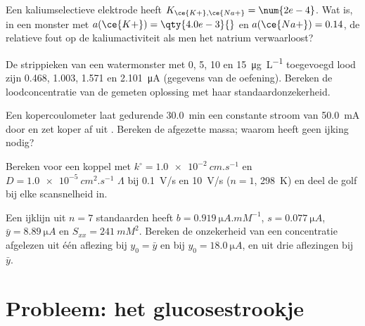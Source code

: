 \begin{exercise}[$\star\star$]\label{exo:b3:electrode-kinetics:8}
Een kaliumselectieve elektrode heeft $K_{\ce{K+},\ce{Na+}} = \num{2e-4}$. Wat
is, in een monster met $a(\ce{K+}) =
\qty{4.0e-3}{}$ en $a(\ce{Na+}) = 0.14$, de relatieve fout op de
kaliumactiviteit als men het natrium verwaarloost?
\end{exercise}

\begin{exercise}[$\star\star$]\label{exo:b3:electrode-kinetics:9}
De strippieken van een watermonster met 0, 5, 10 en
\qty{15}{\micro g.L^{-1}} toegevoegd lood zijn 0.468, 1.003, 1.571 en
\qty{2.101}{\micro A} (gegevens van de oefening). Bereken de
loodconcentratie van de gemeten oplossing met haar standaardonzekerheid.
\end{exercise}

\begin{exercise}[$\star\star\star$]\label{exo:b3:electrode-kinetics:10}
Een kopercoulometer laat gedurende \qty{30.0}{min} een constante stroom van
\qty{50.0}{mA} door en zet koper af uit . Bereken de afgezette
massa; waarom heeft  geen ijking nodig?
\end{exercise}

\begin{exercise}[$\star\star\star$]\label{exo:b3:electrode-kinetics:11}
Bereken voor een koppel met $k^\circ = \qty{1.0e-2}{cm.s^{-1}}$ en $D = \qty{1.0e-5}{cm^2.s^{-1}}$ $\Lambda$ bij \qty{0.1}{V/s}
en \qty{10}{V/s} ($n = 1$, \qty{298}{K}) en deel de golf bij elke
scansnelheid in.
\end{exercise}

\begin{exercise}[$\star\star\star$]\label{exo:b3:electrode-kinetics:12}
Een ijklijn uit $n = 7$ standaarden heeft $b = \qty{0.919}{\micro A.mM^{-1}}$, $s = \qty{0.077}{\micro A}$,
$\bar y = \qty{8.89}{\micro A}$ en $S_{xx} = \qty{241}{mM^2}$. Bereken de
onzekerheid van een concentratie afgelezen uit één aflezing bij $y_0 = \bar y$ en bij $y_0 = \qty{18.0}{\micro A}$,
en uit drie aflezingen bij $\bar y$.
\end{exercise}

\section{Probleem: het glucosestrookje}

